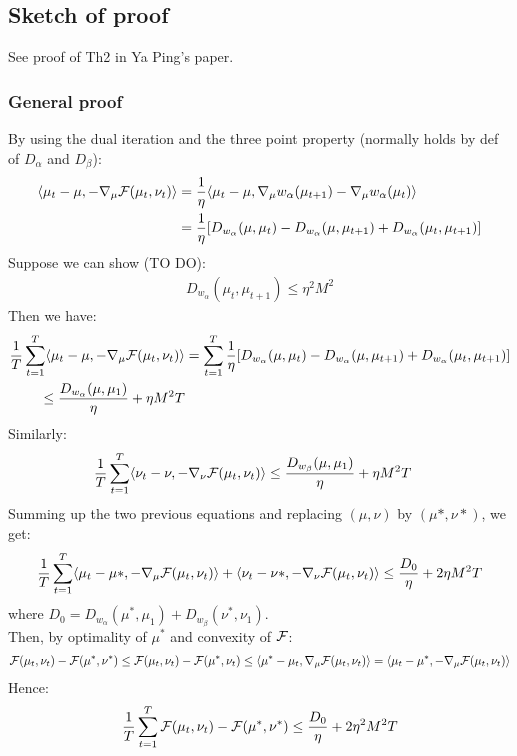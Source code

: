 \documentclass[a4paper, 10pt]{article}
\begin{document}
\subsection{Sketch of proof}

See proof of Th2 in Ya Ping's paper.

\subsubsection{General proof}

By using the dual iteration and the three point property (normally holds by def of $D_{\alpha}$ and $D_{\beta}$):
\begin{align*}
\langle \mu_t-\mu,-\nabla_{\mu} \mathcal{F}(\mu_t,\nu_t)\rangle&=\frac{1}{\eta}\langle \mu_t-\mu,\nabla_{\mu}w_{\alpha}(\mu_{t+1})-\nabla_{\mu}w_{\alpha}(\mu_t)\rangle\\
&=\frac{1}{\eta}[D_{w_{\alpha}}(\mu,\mu_{t})-D_{w_{\alpha}}(\mu,\mu_{t+1})+D_{w_{\alpha}}(\mu_t,\mu_{t+1})]
\end{align*}
Suppose we can show (TO DO): 
\begin{align}\label{eq:bound_gradient}
D_{w_{\alpha}}(\mu_t,\mu_{t+1})\le \eta^2 M^2
\end{align}
Then we have:
\begin{align*}
\frac{1}{T}\sum_{t=1}^T \langle \mu_t-\mu,-\nabla_{\mu} \mathcal{F}(\mu_t,\nu_t)\rangle&= \sum_{t=1}^T \frac{1}{\eta}[D_{w_{\alpha}}(\mu,\mu_{t})-D_{w_{\alpha}}(\mu,\mu_{t+1})+D_{w_{\alpha}}(\mu_t,\mu_{t+1})]\\
\le \frac{D_{w_{\alpha}}(\mu,\mu_1)}{\eta}+\eta M^2 T
\end{align*}
Similarly:
\begin{align*}
\frac{1}{T}\sum_{t=1}^T \langle \nu_t-\nu,-\nabla_{\nu} \mathcal{F}(\mu_t,\nu_t)\rangle&
\le \frac{D_{w_{\beta}}(\mu,\mu_1)}{\eta}+\eta M^2 T
\end{align*}
Summing up the two previous equations and replacing $(\mu,\nu)$ by $(\mu*,\nu*)$, we get:
\begin{equation}
\frac{1}{T}\sum_{t=1}^T \langle \mu_t-\mu*,-\nabla_{\mu} \mathcal{F}(\mu_t,\nu_t)\rangle + \langle \nu_t-\nu*,-\nabla_{\nu} \mathcal{F}(\mu_t,\nu_t)\rangle\le \frac{D_0}{\eta}+2\eta M^2 T
\end{equation}
where $D_0=D_{w_{\alpha}}(\mu^*,\mu_1)+D_{w_{\beta}}(\nu^*,\nu_1)$.\\

\noindent Then, by optimality of $\mu^*$ and convexity of $\mathcal{F}$:
\begin{multline*}
\mathcal{F}(\mu_t,\nu_t)-\mathcal{F}(\mu^*,\nu^*)\le \mathcal{F}(\mu_t,\nu_t)-\mathcal{F}(\mu^*,\nu_t)
\le \langle \mu^*-\mu_t,\nabla_{\mu}\mathcal{F}(\mu_t,\nu_t)\rangle= \langle \mu_t-\mu^*,-\nabla_{\mu}\mathcal{F}(\mu_t,\nu_t)\rangle
\end{multline*}
Hence:
\begin{equation}
\frac{1}{T}\sum_{t=1}^T  
\mathcal{F}(\mu_t,\nu_t)-\mathcal{F}(\mu^*,\nu^*) \le \frac{D_0}{\eta}+2\eta^2 M^2 T
\end{equation}
\end{document}
